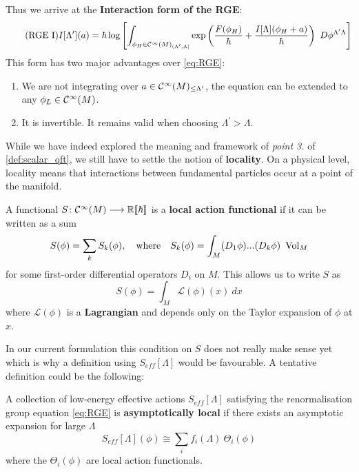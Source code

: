 Thus we arrive at the \textbf{Interaction form of the RGE}:
\begin{align}
\label{eq:RGE_interaction}\tag{RGE I}
  I[\Lambda^\prime](a) = \hbar \log \left[  \int_{\phi_H \in \Ci(M)_{(\Lambda^\prime,\Lambda]}} \exp\left(\frac{F(\phi_H)}{\hbar} + \frac{I[\Lambda](\phi_H + a)}{\hbar} \right) \ D\phi^{\Lambda^\prime \Lambda} \right]
\end{align}
This form has two major advantages over \eqref{eq:RGE}:
\begin{enumerate}
  \item We are not integrating over $a \in \mathcal{C}^{\infty}(M)_{\leq \Lambda^\prime}$, the equation can be extended to any $\phi_L \in \Ci(M)$.

  \item It is invertible. It remains valid when choosing $\Lambda^\prime > \Lambda$.
\end{enumerate}

While we have indeed explored the meaning and framework of \emph{point 3.} of \ref{def:scalar_qft}, we still have to settle the notion of \textbf{locality}. On a physical level, locality means that interactions between fundamental particles occur at a point of the manifold.

\begin{definition}
  A functional $S\colon \mathcal{C}^{\infty}(M) \longrightarrow \mathbb{R} \llbracket \hbar \rrbracket$ is a \textbf{local action functional} if it can be written as a sum
  $$ S(\phi) = \sum_k S_k (\phi), \quad \text{where} \quad S_k(\phi) = \int_M (D_1 \phi) ... (D_k \phi) \ \vol_M$$
  for some first-order differential operators $D_i$ on $M$. This allows us to write $S$ as
  $$ S(\phi) = \int_M \mathcal{L}(\phi)(x) \ dx $$
  where $\mathcal{L}(\phi)$ is a \textbf{Lagrangian} and depends only on the Taylor expansion of $\phi$ at $x$.
\end{definition}

In our current formulation this condition on $S$ does not really make sense yet which is why a definition using $S_{eff}[\Lambda]$ would be favourable. A tentative definition could be the following:

\begin{definition}
  A collection of low-energy effective actions $S_{eff}[\Lambda]$ satisfying the renormalisation group equation \ref{eq:RGE} is \textbf{asymptotically local} if there exists an asymptotic expansion for large $\Lambda$
  $$ S_{eff}[\Lambda] (\phi) \cong \sum_i f_i (\Lambda) \ \Theta_i (\phi) $$
  where the $\Theta_i (\phi)$ are local action functionals.
\end{definition}

